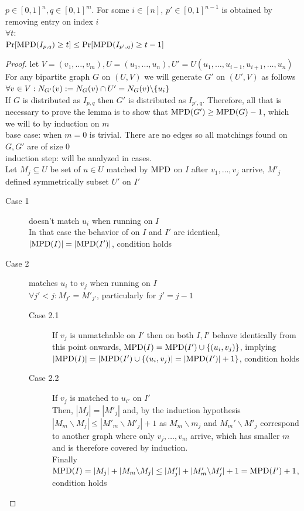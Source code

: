 \begin{lemma}
	\label{deg-lm1}
	$p\in[0,1]^n,q\in[0,1]^m$. For some $i\in[n]$, $p'\in[0,1]^{n-1}$ is obtained by removing entry on index $i$\\
	$\forall t:$\\
	$\Pr[\mathrm{MPD}(I_{p,q})\geq t]\leq\Pr[\mathrm{MPD}(I_{p',q})\geq t-1]$
\end{lemma}
\begin{proof}
	let $V=(v_1,\dots,v_m),U=(u_1,\dots,u_n),U'=U(u_1,\dots,u_{i-1},u_{i+1},\dots,u_n)$\\
	For any bipartite graph $G$ on $(U,V)$ we will generate $G'$ on $(U',V)$ as follows\\
	$\forall v\in V: N_{G'}(v):=N_{G}(v)\cap U'=N_{G}(v)\backslash\{u_i\}$\\
	If $G$ is distributed as $I_{p,q}$ then $G'$ is distributed as $I_{p',q}$. Therefore, all that is necessary to prove the lemma is to show that $\mathrm{MPD}(G')\geq \mathrm{MPD}(G)-1$, which we will to by induction on $m$\\
	base case: when $m=0$ is trivial. There are no edges so all matchings found on $G,G'$ are of size 0\\
	induction step: will be analyzed in cases.\\
	Let $M_j\subseteq U$ be set of $u\in U$ matched by $\mathrm{MPD}$ on $I$ after $v_1,\dots,v_j$ arrive, $M'_j$ defined symmetrically subset $U'$ on $I'$
	\begin{description}
		\item[Case 1] \MPD doesn't match $u_i$ when running on $I$\\
		In that case the behavior of \MPD on $I$ and $I'$ are identical, $|\mathrm{MPD}(I)|=|\mathrm{MPD}(I')|$, condition holds
		\item[Case 2] \MPD matches $u_i$ to $v_j$ when running on $I$\\
		$\forall j'<j: M_{j'}=M'_{j'}$, particularly for $j'=j-1$
		\begin{description}
			\item[Case 2.1] If $v_j$ is unmatchable on $I'$ then \MPD on both $I,I'$ behave identically from this point onwards, $\mathrm{MPD}(I)=\mathrm{MPD}(I')\cup\{(u_i,v_j)\}$, implying $|\mathrm{MPD}(I)|=|\mathrm{MPD}(I')\cup\{(u_i,v_j)|=|\mathrm{MPD}(I')|+1\}$, condition holds
			\item[Case 2.2] If $v_j$ is matched to $u_{i'}$ on $I'$\\
			Then, $|M_j|=|M'_j|$ and, by the induction hypothesis $|M_m\backslash M_j|\leq|M'_m\backslash M'_j|+1$ as $M_m\backslash m_j$ and $M_m'\backslash M'_j$ correspond to another graph where only $v_j,\dots,v_m$ arrive, which has smaller $m$ and is therefore covered by induction.\\
			Finally $\mathrm{MPD}(I)=|M_j|+|M_m\backslash M_j|\leq|M'_j|+|M'_m\backslash M'_j|+1=\mathrm{MPD}(I')+1$, condition holds
		\end{description}
	\end{description}
\end{proof}

